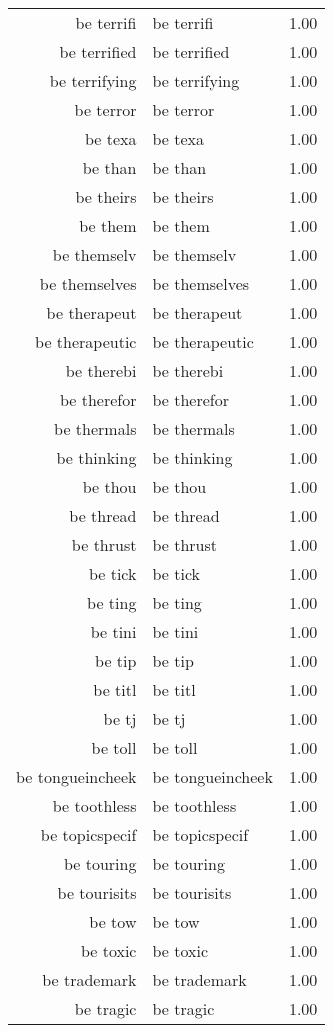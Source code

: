 \begin{table}[ht]
\begin{tabular}{rlr}
  be terrifi & be terrifi & 1.00 \\ 
  be terrified & be terrified & 1.00 \\ 
  be terrifying & be terrifying & 1.00 \\ 
  be terror & be terror & 1.00 \\ 
  be texa & be texa & 1.00 \\ 
  be than & be than & 1.00 \\ 
  be theirs & be theirs & 1.00 \\ 
  be them & be them & 1.00 \\ 
  be themselv & be themselv & 1.00 \\ 
  be themselves & be themselves & 1.00 \\ 
  be therapeut & be therapeut & 1.00 \\ 
  be therapeutic & be therapeutic & 1.00 \\ 
  be therebi & be therebi & 1.00 \\ 
  be therefor & be therefor & 1.00 \\ 
  be thermals & be thermals & 1.00 \\ 
  be thinking & be thinking & 1.00 \\ 
  be thou & be thou & 1.00 \\ 
  be thread & be thread & 1.00 \\ 
  be thrust & be thrust & 1.00 \\ 
  be tick & be tick & 1.00 \\ 
  be ting & be ting & 1.00 \\ 
  be tini & be tini & 1.00 \\ 
  be tip & be tip & 1.00 \\ 
  be titl & be titl & 1.00 \\ 
  be tj & be tj & 1.00 \\ 
  be toll & be toll & 1.00 \\ 
  be tongueincheek & be tongueincheek & 1.00 \\ 
  be toothless & be toothless & 1.00 \\ 
  be topicspecif & be topicspecif & 1.00 \\ 
  be touring & be touring & 1.00 \\ 
  be tourisits & be tourisits & 1.00 \\ 
  be tow & be tow & 1.00 \\ 
  be toxic & be toxic & 1.00 \\ 
  be trademark & be trademark & 1.00 \\ 
  be tragic & be tragic & 1.00 \\ 

\end{tabular}
\end{table}
